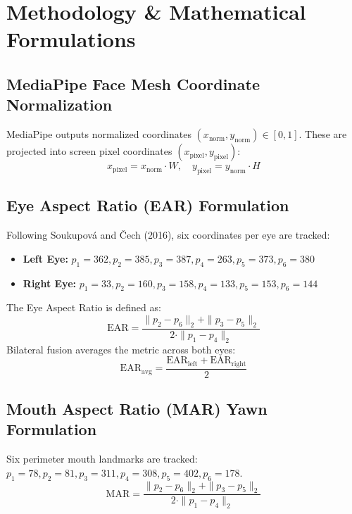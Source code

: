\documentclass[11pt,a4paper]{article}
\begin{document}
\newpage
\section{Methodology \& Mathematical Formulations}

\subsection{MediaPipe Face Mesh Coordinate Normalization}
MediaPipe outputs normalized coordinates $(x_{\text{norm}}, y_{\text{norm}}) \in [0, 1]$. These are projected into screen pixel coordinates $(x_{\text{pixel}}, y_{\text{pixel}})$:
\begin{equation}
x_{\text{pixel}} = x_{\text{norm}} \cdot W, \quad y_{\text{pixel}} = y_{\text{norm}} \cdot H
\end{equation}

\subsection{Eye Aspect Ratio (EAR) Formulation}
Following Soukupov\'a and \v{C}ech (2016), six coordinates per eye are tracked:
\begin{itemize}
    \item \textbf{Left Eye:} $p_1=362, p_2=385, p_3=387, p_4=263, p_5=373, p_6=380$
    \item \textbf{Right Eye:} $p_1=33, p_2=160, p_3=158, p_4=133, p_5=153, p_6=144$
\end{itemize}

The Eye Aspect Ratio is defined as:
\begin{equation}
\text{EAR} = \frac{\|p_2 - p_6\|_2 + \|p_3 - p_5\|_2}{2 \cdot \|p_1 - p_4\|_2}
\end{equation}
Bilateral fusion averages the metric across both eyes:
\begin{equation}
\text{EAR}_{\text{avg}} = \frac{\text{EAR}_{\text{left}} + \text{EAR}_{\text{right}}}{2}
\end{equation}

\subsection{Mouth Aspect Ratio (MAR) Yawn Formulation}
Six perimeter mouth landmarks are tracked: $p_1=78, p_2=81, p_3=311, p_4=308, p_5=402, p_6=178$.
\begin{equation}
\text{MAR} = \frac{\|p_2 - p_6\|_2 + \|p_3 - p_5\|_2}{2 \cdot \|p_1 - p_4\|_2}
\end{equation}
\end{document}
